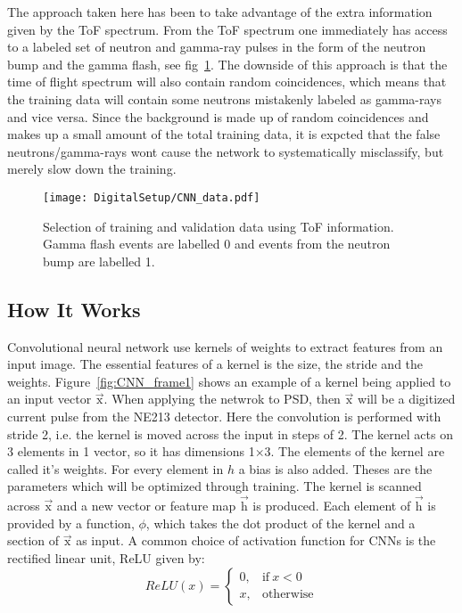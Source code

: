 \documentclass[main.tex]{subfiles}
\begin{document}
The approach taken here has been to take advantage of the extra information given by the ToF spectrum. From the ToF spectrum one immediately has access to a labeled set of neutron and gamma-ray pulses in the form of the neutron bump and the gamma flash, see fig~\ref{fig:CNN_data}. The downside of this approach is that the time of flight spectrum will also contain random coincidences, which means that the training data will contain some neutrons mistakenly labeled as gamma-rays and vice versa. Since the background is made up of random coincidences and makes up a small amount of the total training data, it is expcted that the false neutrons/gamma-rays wont cause the network to systematically misclassify, but merely slow down the training.

\begin{figure}[ht!]
    \centering
        \texttt{[image: DigitalSetup/CNN\_data.pdf]}
        \caption[Selection of training and validation data]{Selection of training and validation data using ToF information. Gamma flash events are labelled 0 and events from the neutron bump are labelled 1.}
    \label{fig:CNN_data} 
\end{figure}

\subsection{How It Works}
Convolutional neural network use kernels of weights to extract features from an input image. The essential features of a kernel is the size, the stride and the weights. Figure~\ref{fig:CNN_frame1} shows an example of a kernel being applied to an input vector $\vec{\textrm{x}}$. When applying the netwrok to PSD, then $\vec{\textrm{x}}$ will be a digitized current pulse from the NE213 detector. Here the convolution is performed with stride 2, i.e. the kernel is moved across the input in steps of 2. The kernel acts on 3 elements in 1 vector, so it has dimensions 1$\times$3. The elements of the kernel are called it's weights. For every element in $h$ a bias is also added. Theses are the parameters which will be optimized through training. The kernel is scanned across $\vec{\textrm{x}}$ and a new vector or feature map $\vec{\textrm{h}}$ is produced. Each element of $\vec{\textrm{h}}$ is provided by a function, $\phi$, which takes the dot product of the kernel and a section of $\vec{\textrm{x}}$ as input. A common choice of activation function for CNNs is the rectified linear unit, ReLU given by:
\begin{equation}
	ReLU(x) = 
	\begin{cases}
    	0, & \text{if}\ x<0 \\
    	x, & \text{otherwise}
    \end{cases}
\end{equation}
\end{document}
